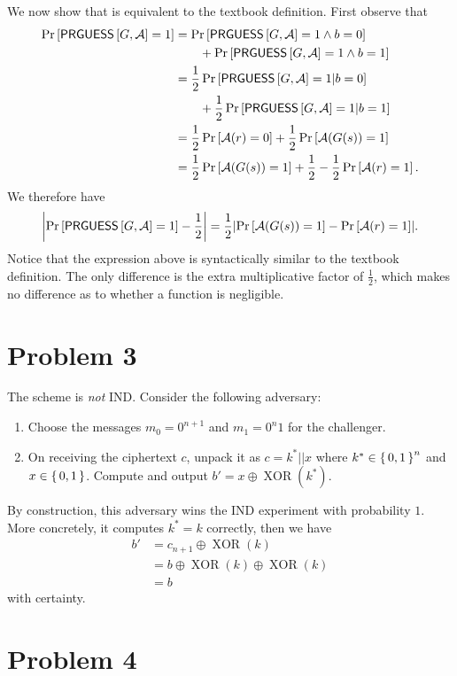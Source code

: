 \documentclass{article}
\theoremstyle{definition}
\DeclareMathOperator{\XOR}{XOR}
\begin{document}
We now show that  is equivalent to the textbook definition.
First observe that
\begin{align*}
    \Pr\left[\mathsf{PRGUESS}\left[G, \mathcal{A}\right] = 1\right] &= \Pr\left[\mathsf{PRGUESS}\left[G, \mathcal{A}\right] = 1 \wedge b=0\right] \\
    &\qquad + \Pr\left[\mathsf{PRGUESS}\left[G, \mathcal{A}\right] = 1 \wedge b=1\right] \\
    &= \frac{1}{2} \Pr\left[\mathsf{PRGUESS}\left[G, \mathcal{A}\right] = 1 | b=0\right] \\
    &\qquad + \frac{1}{2} \Pr\left[\mathsf{PRGUESS}\left[G, \mathcal{A}\right] = 1 | b=1\right] \\
    &= \frac{1}{2}\Pr\left[\mathcal{A}(r)=0\right] + \frac{1}{2}\Pr\left[\mathcal{A}(G(s))=1\right] \\
    &=\frac{1}{2}\Pr\left[\mathcal{A}(G(s))=1\right] +\frac{1}{2} - \frac{1}{2} \Pr\left[\mathcal{A}(r)=1\right].
\end{align*}
We therefore have
$$\abs{\Pr\left[\mathsf{PRGUESS}\left[G, \mathcal{A}\right] = 1\right]-\frac{1}{2}} = \frac{1}{2}\abs{\Pr\left[\mathcal{A}(G(s))=1\right] - \Pr\left[\mathcal{A}(r)=1\right]}.$$
Notice that the expression above is syntactically similar to the textbook definition.
The only difference is the extra multiplicative factor of $\frac{1}{2}$, which makes no difference as to whether a function is negligible.

\section*{Problem 3}

The scheme is \emph{not} IND.
Consider the following adversary:
\begin{enumerate}
    \item Choose the messages $m_0=0^{n+1}$ and $m_1=0^n1$ for the challenger.
    \item On receiving the ciphertext $c$, unpack it as $c=k^*||x$ where $k^*\in\set{0, 1}^n$ and $x\in\set{0, 1}$.
    Compute and output $b'=x\oplus \XOR(k^*)$.
\end{enumerate}
By construction, this adversary wins the IND experiment with probability $1$.
More concretely, it computes $k^*=k$ correctly,
then we have
\begin{align*}
   b' &= c_{n+1}\oplus\XOR(k) \\
   &= b \oplus \XOR(k)\oplus\XOR(k) \\
   &= b
\end{align*}
with certainty.

\section*{Problem 4}
\end{document}
